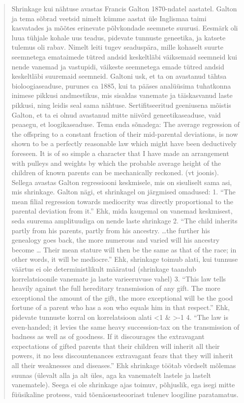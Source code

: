 \documentclass[]{book}
\begin{document}
\begin{quote}
Shrinkage kui nähtuse avastas Francis Galton 1870-ndatel aastatel. Galton ja tema sõbrad veetsid nimelt kümme aastat üle Inglismaa taimi kasvatades ja mõõtes erinevate põlvkondade seemnete suurusi. Eesmärk oli luua tühjale kohale uus teadus, pidevate tunnuste geneetika, ja katsete tulemus oli rabav. Nimelt leiti tugev seaduspära, mille kohaselt suurte seemnetega emataimede tütred andsid keskeltläbi väiksemaid seemneid kui nende vanemad ja vastupidi, väikeste seemnetega emade tütred andsid keskeltläbi suuremaid seemneid. Galtoni usk, et ta on avastanud tähtsa bioloogiaseaduse, purunes ca 1885, kui ta pääses analüüsima tuhatkonna inimese pikkusi andmestikus, mis sisaldas vanemate ja täiskasvanud laste pikkusi, ning leidis seal sama nähtuse. Sertifitseeritud geeniusena mõistis Galton, et ta ei olnud avastanud mitte niivõrd geneetikaseaduse, vaid peaaegu, et loogikaseaduse. Tema enda sõnadega: The average regression of the offspring to a constant fraction of their mid-parental deviations, is now shown to be a perfectly reasonable law which might have been deductively foreseen. It is of so simple a character that I have made an arrangement with pulleys and weights by which the probable average height of the children of known parents can be mechanically reckoned. (vt joonis). Sellega avastas Galton regressiooni keskmisele, mis on sisuliselt sama asi, mis shrinkage. Galton nägi, et shrinkagel on järgmised omadused:
1. ``The mean filial regression towards mediocrity was directly proportional to the parental deviation from it.'' Ehk, mida kaugemal on vanemad keskmisest, seda suurema amplituudiga on nende laste shrinkage
2. ``The child inherits partly from his parents, partly from his ancestry. \ldots{}the further his genealogy goes back, the more numerous and varied will his ancestry become \ldots{} Their mean stature will then be the same as that of the race; in other words, it will be mediocre.'' Ehk, shrinkage toimub alati, kui tunnuse väärtus ei ole deterministlikult määratud (shrinkage taandub korrelatsioonile vanemate ja laste varieeruvuse vahel)
3. ``This law tells heavily against the full hereditary transmission of any gift. The more exceptional the amount of the gift, the more exceptional will be the good fortune of a parent who has a son who equals him in that respect.'' Ehk, pidevate tunnuste korral on korrelatsioon alati \textless{}1 \& \textgreater{}-1
4. ``The law is even-handed; it levies the same heavy succession-tax on the transmission of badness as well as of goodness. If it discourages the extravagant expectations of gifted parents that their children will inherit all their powers, it no less discountenances extravagant fears that they will inherit all their weaknesses and diseases.'' Ehk shrinkage töötab võrdselt mõlemas suunas (ülevalt alla ja alt üles, aga ka vanematelt lastele ja lastelt vanematele). Seega ei ole shrinkage ajas toimuv, põhjuslik, ega isegi mitte füüsikaline protsess, vaid tõenäosusteooriast tulenev loogiline paratamatus.

\end{quote}
\end{document}
